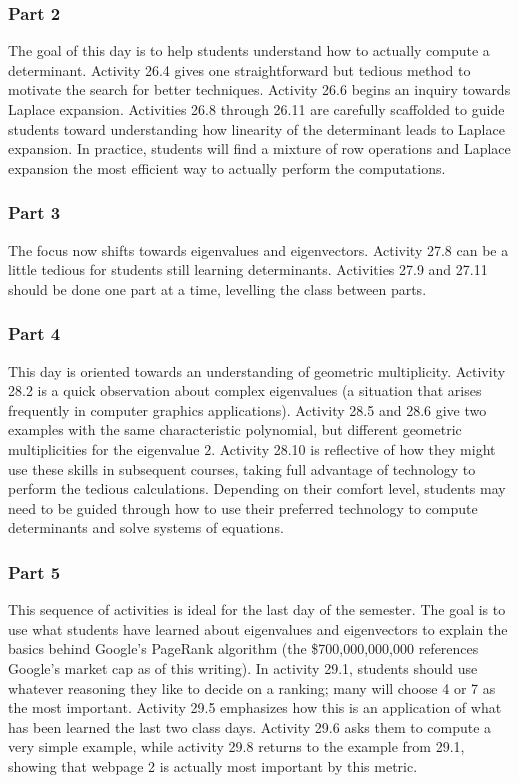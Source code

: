 \documentclass{article}
\begin{document}
\subsubsection*{Part 2}
The goal of this day is to help students understand how to actually compute a determinant.  Activity 26.4 gives one straightforward but tedious method to motivate the search for better techniques.  Activity 26.6 begins an inquiry towards Laplace expansion.  Activities 26.8 through 26.11 are carefully scaffolded to guide students toward understanding how linearity of the determinant leads to Laplace expansion.  In practice, students will find a mixture of row operations and Laplace expansion the most efficient way to actually perform the computations.

\subsubsection*{Part 3}
The focus now shifts towards eigenvalues and eigenvectors.  Activity 27.8 can be a little tedious for students still learning determinants.  Activities 27.9 and 27.11 should be done one part at a time, levelling the class between parts.

\subsubsection*{Part 4}
This day is oriented towards an understanding of geometric multiplicity.  Activity 28.2 is a quick observation about complex eigenvalues (a situation that arises frequently in computer graphics applications).   Activity 28.5 and 28.6 give two examples with the same characteristic polynomial, but different geometric multiplicities for the eigenvalue $2$.  Activity 28.10 is reflective of how they might use these skills in subsequent courses, taking full advantage of technology to perform the tedious calculations.  Depending on their comfort level, students may need to be guided through how to use their preferred technology to compute determinants and solve systems of equations.

\subsubsection*{Part 5}
This sequence of activities is ideal for the last day of the semester.  The goal is to use what students have learned about eigenvalues and eigenvectors to explain the basics behind Google's PageRank algorithm (the \$700,000,000,000 references Google's market cap as of this writing).  In activity 29.1, students should use whatever reasoning they like to decide on a ranking; many will choose 4 or 7 as the most important.  Activity 29.5 emphasizes how this is an application of what has been learned the last two class days.  Activity 29.6 asks them to compute a very simple example, while activity 29.8 returns to the example from 29.1, showing that webpage 2 is actually most important by this metric.
\end{document}
